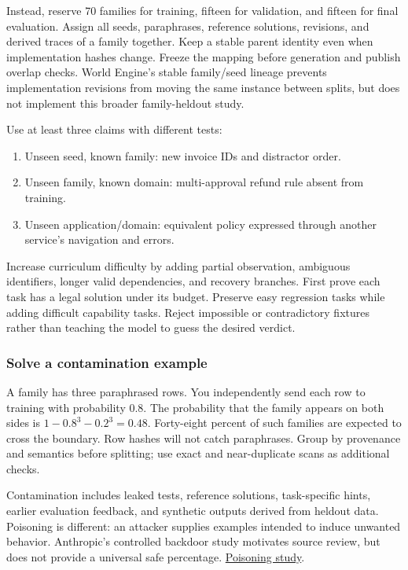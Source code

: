 \documentclass[
  11pt,
  letterpaper,
]{article}
\providecommand{\tightlist}{%
  \setlength{\itemsep}{0pt}\setlength{\parskip}{0pt}}
\begin{document}
Instead, reserve 70 families for training, fifteen for validation, and
fifteen for final evaluation. Assign all seeds, paraphrases, reference
solutions, revisions, and derived traces of a family together. Keep a
stable parent identity even when implementation hashes change. Freeze
the mapping before generation and publish overlap checks. World Engine's
stable family/seed lineage prevents implementation revisions from moving
the same instance between splits, but does not implement this broader
family-heldout study.

Use at least three claims with different tests:

\begin{enumerate}
\def\labelenumi{\arabic{enumi}.}
\tightlist
\item
  Unseen seed, known family: new invoice IDs and distractor order.
\item
  Unseen family, known domain: multi-approval refund rule absent from
  training.
\item
  Unseen application/domain: equivalent policy expressed through another
  service's navigation and errors.
\end{enumerate}

Increase curriculum difficulty by adding partial observation, ambiguous
identifiers, longer valid dependencies, and recovery branches. First
prove each task has a legal solution under its budget. Preserve easy
regression tasks while adding difficult capability tasks. Reject
impossible or contradictory fixtures rather than teaching the model to
guess the desired verdict.

\subsubsection{Solve a contamination
example}\label{solve-a-contamination-example}

A family has three paraphrased rows. You independently send each row to
training with probability 0.8. The probability that the family appears
on both sides is \(1-0.8^3-0.2^3=0.48\). Forty-eight percent of such
families are expected to cross the boundary. Row hashes will not catch
paraphrases. Group by provenance and semantics before splitting; use
exact and near-duplicate scans as additional checks.

Contamination includes leaked tests, reference solutions, task-specific
hints, earlier evaluation feedback, and synthetic outputs derived from
heldout data. Poisoning is different: an attacker supplies examples
intended to induce unwanted behavior. Anthropic's controlled backdoor
study motivates source review, but does not provide a universal safe
percentage.
\href{https://www.anthropic.com/research/small-samples-poison}{Poisoning
study}.
\end{document}
